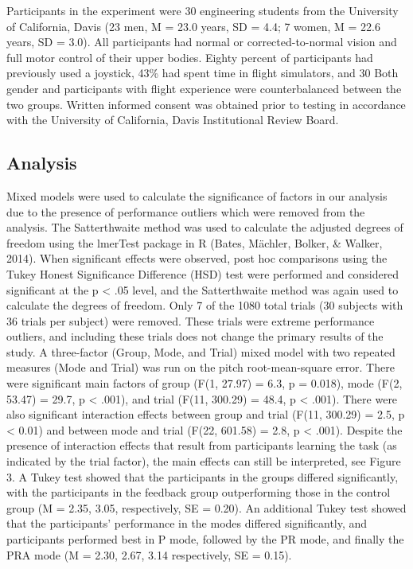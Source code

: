 Participants in the experiment were 30 engineering students from the University of California, Davis (23 men, M = 23.0 years, SD = 4.4; 7 women, M = 22.6 years, SD = 3.0).
All participants had normal or corrected-to-normal vision and full motor control of their upper bodies.
Eighty percent of participants had previously used a joystick, 43\% had spent time in flight simulators, and 30%
Both gender and participants with flight experience were counterbalanced between the two groups.
Written informed consent was obtained prior to testing in accordance with the University of California, Davis Institutional Review Board.

\subsection{Analysis}

Mixed models were used to calculate the significance of factors in our analysis due to the presence of performance outliers which were removed from the analysis.
The Satterthwaite method was used to calculate the adjusted degrees of freedom using the lmerTest package in R (Bates, Mächler, Bolker, \& Walker, 2014).
When significant effects were observed, post hoc comparisons using the Tukey Honest Significance Difference (HSD) test were performed and considered significant at the p < .05 level, and the Satterthwaite method was again used to calculate the degrees of freedom.
Only 7 of the 1080 total trials (30 subjects with 36 trials per subject) were removed.
These trials were extreme performance outliers, and including these trials does not change the primary results of the study.
A three-factor (Group, Mode, and Trial) mixed model with two repeated measures (Mode and Trial) was run on the pitch root-mean-square error.
There were significant main factors of group (F(1, 27.97) = 6.3, p = 0.018), mode (F(2, 53.47) = 29.7, p < .001), and trial (F(11, 300.29) = 48.4, p < .001).
There were also significant interaction effects between group and trial (F(11, 300.29) = 2.5, p < 0.01) and between mode and trial (F(22, 601.58) = 2.8, p < .001).
Despite the presence of interaction effects that result from participants learning the task (as indicated by the trial factor), the main effects can still be interpreted, see Figure 3.
A Tukey test showed that the participants in the groups differed significantly, with the participants in the feedback group outperforming those in the control group (M = 2.35, 3.05, respectively, SE = 0.20).
An additional Tukey test showed that the participants' performance in the modes differed significantly, and participants performed best in P mode, followed by the PR mode, and finally the PRA mode (M = 2.30, 2.67, 3.14 respectively, SE = 0.15).

